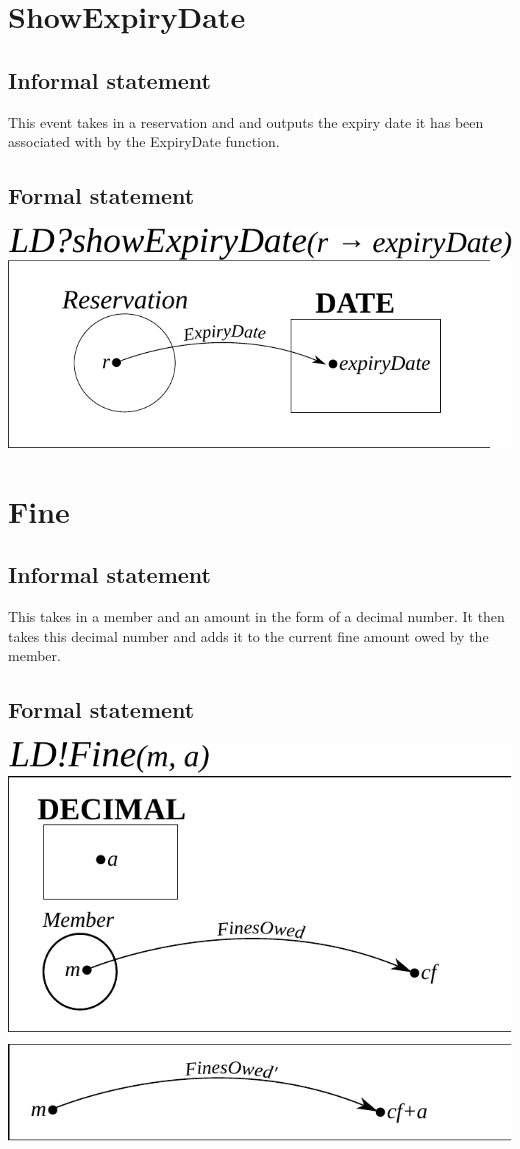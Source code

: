 \documentclass[]{report}
\begin{document}
\section{ShowExpiryDate}
\subsection{Informal statement}
This event takes in a reservation and and outputs the expiry date it has been associated with by the ExpiryDate function.
\subsection{Formal statement}
\begin{center}
	\includegraphics{show_expiry_date.pdf}
\end{center}
\newpage
\section{Fine}
\subsection{Informal statement}
This takes in a member and an amount in the form of a decimal number. It then takes this decimal number and adds it to the current fine amount owed by the member.
\subsection{Formal statement}
\begin{center}
	\includegraphics{add_fine.pdf}
\end{center}
\newpage
\end{document}
